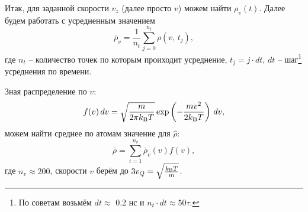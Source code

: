 Итак, для заданной скорости $v_z$ (далее просто $v$) можем найти $\rho_{v}(t)$. Далее будем работать с усредненным значением
\begin{equation*}
    \bar{\rho}_{v} = \frac{1}{n_t} \sum_{j=0}^{n_t} \rho\left(
        v,\, t_j
    \right),
\end{equation*}
где $n_t$ -- количество точек по которым проиходит усреднение, $t_j = j \cdot dt$, $dt$ -- шаг\footnote{
    По советам \cite{main_2006} возьмём  $dt \approx$ 0.2 нс и $n_t \cdot dt \approx 50 \tau$.
}  усреднения по времени.

Зная распределение по $v$:
\begin{equation*}
    f(v) \, d v = \sqrt{\frac{m}{2\pi k_{\textnormal{B}} T}} \exp\left(
        - \frac{m v^2}{2 k_{\textnormal{B}} T}
    \right) \, d v,
\end{equation*}
можем найти среднее по атомам значение для $\hat{\rho}$:
\begin{equation*}
    \bar{\rho} = \sum_{i=1}^{n_v} \bar{\rho}_v(v) f(v),
\end{equation*}
где $n_v \approx 200$, скорости $v$ берём до $3 v_Q = \sqrt{\frac{k_{\textnormal{B}} T}{m}}$.
